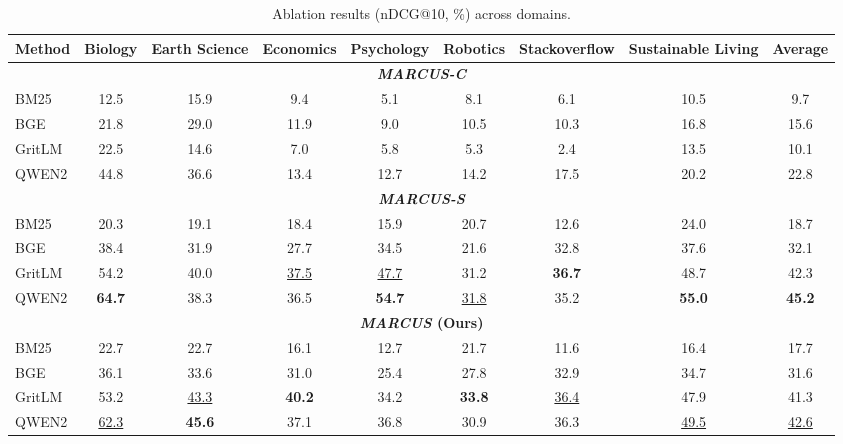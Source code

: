 \documentclass[11pt]{article}
\newcommand{\mymethod}{\emph{MARCUS}}
\newcommand{\clean}{\emph{MARCUS-C}}
\newcommand{\splits}{\emph{MARCUS-S}}
\begin{document}
\begin{table}[t]
\centering
\footnotesize
\begin{adjustbox}{width=1.0\linewidth}
\begin{tabular}{lcccccccc}
\toprule
\textbf{Method} & Biology & Earth Science & Economics & Psychology & Robotics & Stackoverflow & Sustainable Living & Average \\
\midrule
\multicolumn{9}{c}{\textbf{\clean{}}} \\
\midrule
BM25   & 12.5 & 15.9 &  9.4 &  5.1 &  8.1 &  6.1 & 10.5 &  9.7 \\
BGE    & 21.8 & 29.0 & 11.9 &  9.0 & 10.5 & 10.3 & 16.8 & 15.6 \\
GritLM & 22.5 & 14.6 &  7.0 &  5.8 &  5.3 &  2.4 & 13.5 & 10.1 \\
QWEN2  & 44.8 & 36.6 & 13.4 & 12.7 & 14.2 & 17.5 & 20.2 & 22.8 \\
\midrule
\multicolumn{9}{c}{\textbf{\splits{}}} \\
\midrule
BM25   & 20.3 & 19.1 & 18.4 & 15.9 & 20.7 & 12.6 & 24.0 & 18.7 \\
BGE    & 38.4 & 31.9 & 27.7 & 34.5 & 21.6 & 32.8 & 37.6 & 32.1 \\
GritLM & 54.2 & 40.0 & \underline{37.5} & \underline{47.7} & 31.2 & \textbf{36.7} & 48.7 & 42.3 \\
QWEN2  & \textbf{64.7} & 38.3 & 36.5 & \textbf{54.7} & \underline{31.8} & 35.2 & \textbf{55.0} & \textbf{45.2} \\
\midrule
\multicolumn{9}{c}{\textbf{\mymethod{} (Ours)}} \\
\midrule
BM25   & 22.7 & 22.7 & 16.1 & 12.7 & 21.7 & 11.6 & 16.4 & 17.7 \\
BGE    & 36.1 & 33.6 & 31.0 & 25.4 & 27.8 & 32.9 & 34.7 & 31.6 \\
GritLM & 53.2 & \underline{43.3} & \textbf{40.2} & 34.2 & \textbf{33.8} & \underline{36.4} & 47.9 & 41.3 \\
QWEN2  & \underline{62.3} & \textbf{45.6} & 37.1 & 36.8 & 30.9 & 36.3 & \underline{49.5} & \underline{42.6} \\
\bottomrule
\end{tabular}
\end{adjustbox}
\vspace{0.5em}
\caption{Ablation results (nDCG@10, \%) across domains. }
\label{tab:ablation-cleaning}
\end{table}
\end{document}
